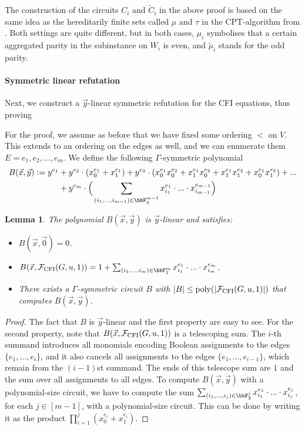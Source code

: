 \documentclass[10pt,a4paper]{article}
\newtheorem{lemma}[theorem]{Lemma}
\newcommand{\Ff}{{\cal F}}
\newcommand{\CFI}{\Ff_{\mathrm{CFI}}}
\newcommand{\poly}{\text{\upshape poly}}
\newcommand{\mutilde}{\tilde{\mu}}
\begin{document}
The construction of the circuits $C_i$ and $\widetilde{C}_i$ in the above proof is based on the same idea as the hereditarily finite sets called $\mu$ and $\tau$ in the CPT-algorithm from \cite{dawar2008}. Both settings are quite different, but in both cases, $\mu_i$ symbolises that a certain aggregated parity in the subinstance on $W_i$ is even, and $\mutilde_i$ stands for the odd parity. 




\paragraph*{Symmetric linear refutation}

Next, we construct a $\vec y$-linear symmetric refutation for the CFI equations, thus proving

\CFIupperboundLinear*
For the proof, we assume as before that we have
fixed some ordering $<$ on $V$. This extends to an ordering on the edges as well, and we can enumerate them $E = e_1,e_2,...,e_m$. We define the following $\Gamma$-symmetric polynomial
\begin{align*}
	B(\vec x, \vec y) := y^{e_1} &+ y^{e_2} \cdot (x^{e_1}_0+x^{e_1}_1) + y^{e_3} \cdot (x^{e_1}_0x^{e_2}_0 + x^{e_1}_1x^{e_2}_0 + x^{e_1}_1x^{e_2}_1 + x^{e_1}_0x^{e_2}_1) + ... \\
	&+ y^{e_m} \cdot \Big( \sum_{(i_1,...,i_{m-1}) \in \bbF_2^{m-1}} x^{e_1}_{i_1} \cdot ... \cdot x^{e_{m-1}}_{i_{m-1}} \Big)
\end{align*}
\begin{lemma}
	\label{lem:Bcomputable}
	The polynomial $B(\vec x, \vec y)$ is $\vec y$-linear and satisfies: 
	\begin{itemize}
		\item $B(\vec x, \vec 0) = 0$.
		\item $B(\vec x, \CFI(G,u,1)) = 1 + \sum_{(i_1,...,i_{m}) \in \bbF_2^{m}} x^{e_1}_{i_1} \cdot ... \cdot x^{e_{m}}_{i_{m}}$. 
		\item There exists a $\Gamma$-symmetric circuit $B$ with $|B| \leq \poly(| \CFI(G,u,1)|)$ that computes $B(\vec x, \vec y)$.
	\end{itemize}	
\end{lemma}	
\begin{proof}
	The fact that $B$ is $\vec y$-linear and the first property are easy to see. For the second property, note that $B(\vec x, \CFI(G,u,1))$ is a telescoping sum. The $i$-th summand introduces all monomials encoding Boolean assignments to the edges $\{e_1,...,e_i\}$, and it also cancels all assignments to the edges $\{e_1,...,e_{i-1}\}$, which remain from the $(i-1)$st summand. The ends of this telescope sum are $1$ and the sum over all assignments to all edges. To compute $B(\vec x, \vec y)$ with a polynomial-size circuit, we have to compute the sum $\sum_{(i_1,...,i_{j}) \in \bbF_2^{j}} x^{e_1}_{i_1} \cdot ... \cdot x^{e_{j}}_{i_{j}}$, for each $j \in [m-1]$, with a polynomial-size circuit. This can be done by writing it as the product $\prod_{i=1}^j (x^{e_i}_0 + x^{e_i}_1)$.    
\end{proof}		
\end{document}
